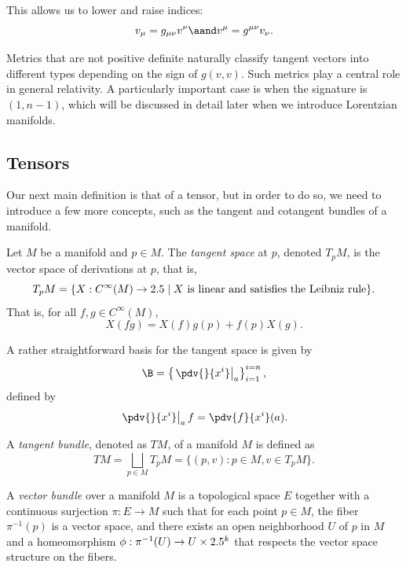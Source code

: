 This allows us to lower and raise indices:
\[%
  v_\mu = g_{\mu\nu} v^\nu \aand v^\mu = g^{\mu\nu} v_\nu
.\]%

Metrics that are not positive definite naturally classify tangent vectors into different types depending on the sign of $g(v, v)$. Such metrics play a central role in general relativity. A particularly important case is when the signature is $(1, n-1)$, which will be discussed in detail later when we introduce Lorentzian manifolds.

\subsection{Tensors} Our next main definition is that of a tensor, but in order to do so, we need to introduce a few more concepts, such as the tangent and cotangent bundles of a manifold.
\begin{definition}
  Let $M$ be a manifold and $p \in M$. The \emph{tangent space} at $p$, denoted $T_pM$, is the vector space of derivations at $p$, that is,
  \[%
    T_pM = \{X : C^\infty(M) \to \R \mid X~\text{is linear and satisfies the Leibniz rule}\}
  .\]%
  That is, for all $f,g \in C^\infty(M)$,
  \[%
    X(fg) = X(f)g(p) + f(p)X(g)
  .\]%
\end{definition}



A rather straightforward basis for the tangent space is given by
\[%
  \B = \left\{\left.\pdv{}{x^i}\right\rvert_a\right\}_{i=1}^{i=n}
,\]%
defined by
\[%
  \left.\pdv{}{x^i}\right\rvert_a f = \pdv{f}{x^i}(a)
.\]%

\begin{definition}
  A \emph{tangent bundle}, denoted as $TM$, of a manifold $M$ is defined as
  \[%
    TM = \bigsqcup_{p \in M} T_pM = \{(p, v) : p \in M, v \in T_pM\}
  .\]%
\end{definition}



\begin{definition}
  A \emph{vector bundle} over a manifold $M$ is a topological space $E$ together with a continuous surjection $\pi : E \to M$ such that for each point $p \in M$, the fiber $\pi^{-1}(p)$ is a vector space, and there exists an open neighborhood $U$ of $p$ in $M$ and a homeomorphism $\phi : \pi^{-1}(U) \to U \times 2.5^k$ that respects the vector space structure on the fibers.
\end{definition}

